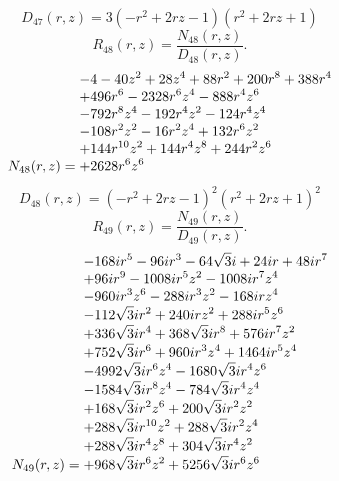 \documentclass[11pt,a4paper]{article}
\begin{document}
\begin{equation}
D_{47}(r,z)=3 \left(- r^{2} + 2 r z - 1\right) \left(r^{2} + 2 r z + 1\right)
\label{eq:cat-denominator-47}
\end{equation}
\begin{equation}
R_{48}(r,z)=\frac{N_{48}(r,z)}{D_{48}(r,z)}.
\label{eq:cat-rational-48}
\end{equation}
\begin{equation}
N_{48}(r,z)=\shortstack[l]{$\displaystyle  - 4 - 40 z^{2} + 28 z^{4} + 88 r^{2} + 200 r^{8} + 388 r^{4}$\\
$\displaystyle  + 496 r^{6} - 2328 r^{6} z^{4} - 888 r^{4} z^{6}$\\
$\displaystyle  - 792 r^{8} z^{4} - 192 r^{4} z^{2} - 124 r^{4} z^{4}$\\
$\displaystyle  - 108 r^{2} z^{2} - 16 r^{2} z^{4} + 132 r^{6} z^{2}$\\
$\displaystyle  + 144 r^{10} z^{2} + 144 r^{4} z^{8} + 244 r^{2} z^{6}$\\
$\displaystyle  + 2628 r^{6} z^{6}$}
\label{eq:cat-numerator-48}
\end{equation}
\begin{equation}
D_{48}(r,z)=\left(- r^{2} + 2 r z - 1\right)^{2} \left(r^{2} + 2 r z + 1\right)^{2}
\label{eq:cat-denominator-48}
\end{equation}
\begin{equation}
R_{49}(r,z)=\frac{N_{49}(r,z)}{D_{49}(r,z)}.
\label{eq:cat-rational-49}
\end{equation}
\begin{equation}
N_{49}(r,z)=\shortstack[l]{$\displaystyle  - 168 i r^{5} - 96 i r^{3} - 64 \sqrt{3} i + 24 i r + 48 i r^{7}$\\
$\displaystyle  + 96 i r^{9} - 1008 i r^{5} z^{2} - 1008 i r^{7} z^{4}$\\
$\displaystyle  - 960 i r^{3} z^{6} - 288 i r^{3} z^{2} - 168 i r z^{4}$\\
$\displaystyle  - 112 \sqrt{3} i r^{2} + 240 i r z^{2} + 288 i r^{5} z^{6}$\\
$\displaystyle  + 336 \sqrt{3} i r^{4} + 368 \sqrt{3} i r^{8} + 576 i r^{7} z^{2}$\\
$\displaystyle  + 752 \sqrt{3} i r^{6} + 960 i r^{3} z^{4} + 1464 i r^{5} z^{4}$\\
$\displaystyle  - 4992 \sqrt{3} i r^{6} z^{4} - 1680 \sqrt{3} i r^{4} z^{6}$\\
$\displaystyle  - 1584 \sqrt{3} i r^{8} z^{4} - 784 \sqrt{3} i r^{4} z^{4}$\\
$\displaystyle  + 168 \sqrt{3} i r^{2} z^{6} + 200 \sqrt{3} i r^{2} z^{2}$\\
$\displaystyle  + 288 \sqrt{3} i r^{10} z^{2} + 288 \sqrt{3} i r^{2} z^{4}$\\
$\displaystyle  + 288 \sqrt{3} i r^{4} z^{8} + 304 \sqrt{3} i r^{4} z^{2}$\\
$\displaystyle  + 968 \sqrt{3} i r^{6} z^{2} + 5256 \sqrt{3} i r^{6} z^{6}$}
\label{eq:cat-numerator-49}
\end{equation}
\end{document}

